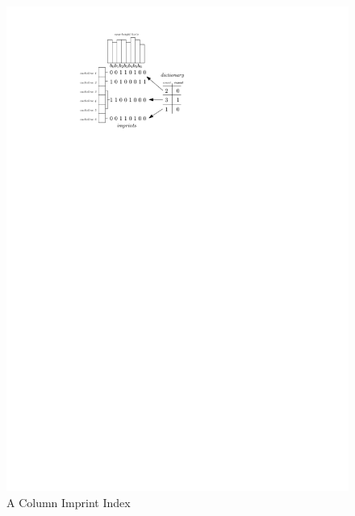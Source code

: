 \documentclass[sigconf]{acmart}
\begin{document}
\begin{figure}
\begin{center}
\includegraphics{imprints.pdf}
\end{center}
\caption{A Column Imprint Index\label{fig:imprints}}
\end{figure}
\end{document}
